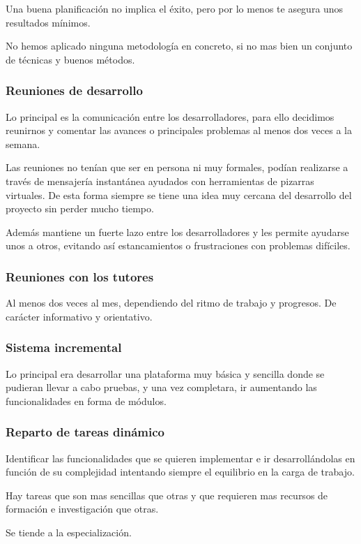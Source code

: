 Una buena planificación no implica el éxito, pero por lo menos te asegura unos
resultados mínimos.

No hemos aplicado ninguna metodología en concreto, si no mas bien un conjunto
de técnicas y buenos métodos.

\subsubsection*{Reuniones de desarrollo}
Lo principal es la comunicación entre los desarrolladores, para ello decidimos
reunirnos y comentar las avances o principales problemas al menos dos veces a
la semana.

Las reuniones no tenían que ser en persona ni muy formales, podían realizarse a
través de mensajería instantánea ayudados con herramientas de pizarras
virtuales. De
esta forma siempre se tiene una idea muy cercana del desarrollo del proyecto sin
perder mucho tiempo.

Además mantiene un fuerte lazo entre los desarrolladores y les permite ayudarse
unos a otros, evitando así estancamientos o frustraciones con problemas
difíciles.
\subsubsection*{Reuniones con los tutores}
Al menos dos veces al mes, dependiendo del ritmo de trabajo y progresos. De
carácter informativo y orientativo.

\subsubsection*{Sistema incremental}
Lo principal era desarrollar una plataforma muy básica y sencilla donde se
pudieran llevar a cabo pruebas, y una vez completara, ir aumentando las
funcionalidades en forma de módulos.

\subsubsection*{Reparto de tareas dinámico} %
Identificar las funcionalidades que se quieren implementar e ir
desarrollándolas en función de su complejidad intentando
siempre el equilibrio en la carga de trabajo.

Hay tareas que son mas sencillas que otras y que requieren mas recursos de
formación e investigación que otras.

Se tiende a la especialización.

